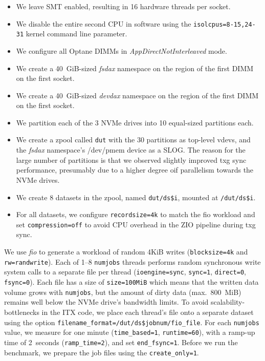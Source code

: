 \documentclass[12pt,a4paper,twoside]{book}
\begin{document}
\begin{itemize}[noitemsep]
    \item We leave SMT enabled, resulting in 16 hardware threads per socket.
    \item We disable the entire second CPU in software using the \lstinline{isolcpus=8-15,24-31} kernel command line parameter.
    \item We configure all Optane DIMMs in \textit{AppDirectNotInterleaved} mode.
    \item We create a 40~GiB-sized \textit{fsdax} namespace on the region of the first DIMM on the first socket.
    \item We create a 40~GiB-sized \textit{devdax} namespace on the region of the first DIMM on the first socket.
    \item We partition each of the 3 NVMe drives into 10 equal-sized partitions each.
    \item We create a zpool called \texttt{dut} with the 30 partitions as top-level vdevs, and the \textit{fsdax} namespace's /dev/pmem device as a SLOG.
        The reason for the large number of partitions is that we observed slightly improved txg sync performance, presumably due to a higher degree oif parallelism towards the NVMe drives.
    \item We create 8 datasets in the zpool, named \lstinline{dut/ds$i}, mounted at \lstinline{/dut/ds$i}.
    \item For all datasets, we configure \lstinline{recordsize=4k} to match the fio workload and set \lstinline{compression=off} to avoid CPU overhead in the ZIO pipeline during txg sync.
\end{itemize}

We use \textit{fio} to generate a workload of random 4KiB writes (\lstinline{blocksize=4k} and \lstinline{rw=randwrite}).
Each of 1--8 \lstinline{numjobs} threads performs random synchronous write system calls to a separate file per thread (\lstinline{ioengine=sync}, \lstinline{sync=1}, \lstinline{direct=0}, \lstinline{fsync=0}).
Each file has a size of \lstinline{size=100MiB} which means that the written data volume grows with \lstinline{numjobs}, but the amount of dirty data (max.~800~MiB) remains well below the NVMe drive's bandwidth limits.
To avoid scalability-bottlenecks in the ITX code, we place each thread's file onto a separate dataset using the option \lstinline{filename_format=/dut/ds$jobnum/fio_file}.
For each \lstinline{numjobs} value, we measure for one minute (\lstinline{time_based=1}, \lstinline{runtime=60}), with a ramp-up time of 2~seconds (\lstinline{ramp_time=2}), and set \lstinline{end_fsync=1}.
Before we run the benchmark, we prepare the job files using the \lstinline{create_only=1}.
\end{document}
